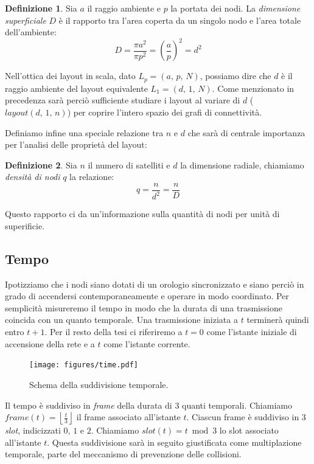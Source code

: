 \documentclass[a4paper,11pt]{article}
\theoremstyle{definition}
\newtheorem{definition}{Definizione}
\begin{document}
\begin{definition}
Sia $a$ il raggio ambiente e $p$ la portata dei nodi. La \emph{dimensione superficiale} $D$ è il rapporto tra l'area coperta da un singolo nodo e l'area totale dell'ambiente:
\begin{equation*}
D = \frac{\pi a^2}{\pi p^2} = \left(\frac{a}{p}\right)^2 = d^2
\end{equation*}
\end{definition}

Nell'ottica dei layout in scala, dato $L_p = (a,\,p,\,N)$, possiamo dire che $d$ è il raggio ambiente del layout equivalente $L_1 = (d,\,1,\,N)$. Come menzionato in precedenza sarà perciò sufficiente studiare i layout al variare di $d$ ($layout(d,\,1,\,n)$) per coprire l'intero spazio dei grafi di connettività.

Definiamo infine una speciale relazione tra $n$ e $d$ che sarà di centrale importanza per l'analisi delle proprietà del layout:

\begin{definition}
Sia $n$ il numero di satelliti e $d$ la dimensione radiale, chiamiamo \emph{densità di nodi} $q$ la relazione:
\begin{equation*}
q = \frac{n}{d^2} = \frac{n}{D}
\end{equation*}
\end{definition}

Questo rapporto ci da un'informazione sulla quantità di nodi per unità di superificie.

\subsection{Tempo}

Ipotizziamo che i nodi siano dotati di un orologio sincronizzato e siano perciò in grado di accendersi contemporaneamente e operare in modo coordinato. Per semplicità misureremo il tempo in modo che la durata di una trasmissione coincida con un quanto temporale. Una trasmissione iniziata a $t$ terminerà quindi entro $t+1$. Per il resto della tesi ci riferiremo a $t=0$ come l'istante iniziale di accensione della rete e a $t$ come l'istante corrente.

\begin{figure}[H]
\centering
\texttt{[image: figures/time.pdf]}
\caption{Schema della suddivisione temporale.}
\end{figure}

Il tempo è suddiviso in \emph{frame} della durata di 3 quanti temporali. Chiamiamo $frame(t) =  \left\lfloor\frac{t}{3}\right\rfloor$ il frame associato all'istante $t$. Ciascun frame è suddiviso in 3 \emph{slot}, indicizzati $0,\,1 \text{ e } 2$. Chiamiamo $slot(t) = t \bmod 3$ lo slot associato all'istante $t$. Questa suddivisione sarà in seguito giustificata come multiplazione temporale, parte del meccanismo di prevenzione delle collisioni.
\end{document}
